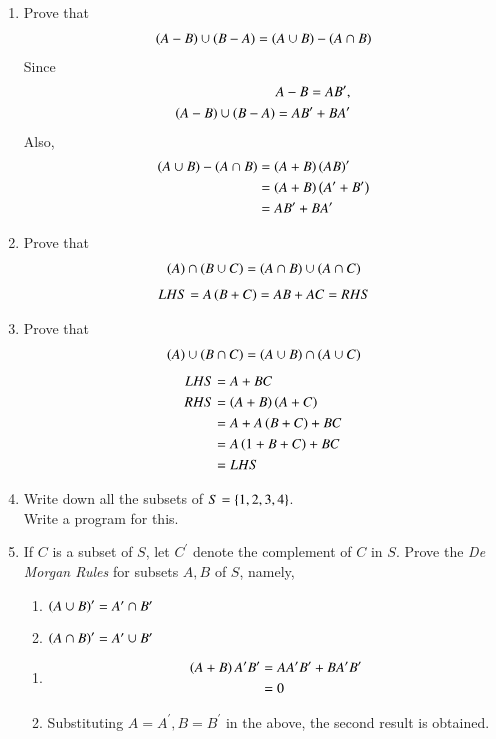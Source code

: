 \begin{enumerate}[label=\arabic*.,ref=\thesubsection.\theenumi]
	\item Prove that 
		\begin{align}
			\left(A-B\right)\cup
			\left(B-A\right) = 
			\left(A\cup B\right) - 
			\left(A\cap B\right)
		\end{align}
		\solution 
		Since 
		\begin{align}
			A-B = AB^{\prime},
			\\
			\left(A-B\right)\cup
			\left(B-A\right) =  AB^{\prime} + BA^{\prime}
		\end{align}
		Also, 
		\begin{align}
			\left(A\cup B\right) - 
			\left(A\cap B\right)
			&			= \left(A+B\right)\left(AB\right)^{\prime}
			\\
			&			= \left(A+B\right)\left(A^{\prime}+B^{\prime}\right)
			\\
			&= AB^{\prime} + BA^{\prime}
		\end{align}
	\item Prove that 
		\begin{align}
			\left(A\right)\cap
			\left(B \cup C\right) = 
			\left(A\cap B\right) \cup 
			\left(A\cap C\right)
		\end{align}
		\solution 
		\begin{align}
			LHS = A\left(B+C\right) = AB + AC = RHS
		\end{align}
	\item Prove that 
		\begin{align}
			\left(A\right)\cup
			\left(B \cap C\right) = 
			\left(A\cup B\right) \cap 
			\left(A\cup C\right)
		\end{align}
		\solution 
		\begin{align}
			LHS &= A+BC 
			\\
			RHS &= \left(A+B\right)\left(A+C\right)
			\\
			&= A + A\left(B+C\right) + BC
			\\
			&= A\left(1+B+C\right) + BC
			\\
			&= LHS
		\end{align}
	\item Write down all the subsets of $S = \left\{1,2,3,4\right\}$.
		\\
		\solution Write a program for this.
	\item If $C$ is a subset of $S$, let $C^{\prime}$ denote the complement of $C$ in $S$.  Prove the
		{\em De Morgan Rules} for subsets $A, B$ of $S$, namely, 

\begin{enumerate}
	\item $\left(A \cup B\right)^{\prime}= A^{\prime} \cap B^{\prime}$
	\item $\left(A \cap B\right)^{\prime}= A^{\prime} \cup B^{\prime}$
\end{enumerate}
\solution 
\begin{enumerate}
	\item 
		\begin{align}
			\left(A+B\right)A^{\prime}B^{\prime} &= AA^{\prime}B^{\prime} + BA^{\prime}B^{\prime} 
			\\
			&= 0
		\end{align}
	\item Substituting $A = A^{\prime}, B = B^{\prime}$ in the above, the second result is obtained.


\end{enumerate}
\end{enumerate}
